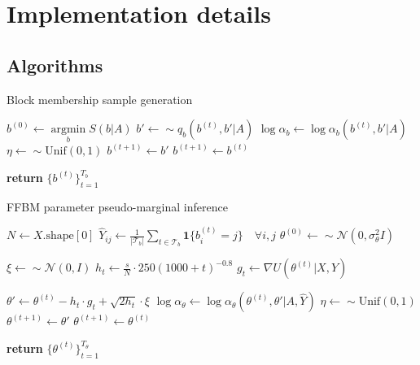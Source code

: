 \section{Implementation details}

\subsection{Algorithms}
\label{appdx:algorithms}

\begin{algorithm} %
	\caption{Block membership sample generation} %
	\label{alg:b-samples} %
	\begin{algorithmic} %
		\State $b^{(0)} \gets \underset{b}{\operatorname{argmin}}S(b|A)$ 
		\State $b' \gets \sim q_b(b^{(t)}, b' | A)$
		\State $\log \alpha_b \gets \log \alpha_b(b^{(t)}, b' | A)$
		\State $\eta \gets \sim \textrm{Unif}(0,1)$
		\State $b^{(t+1)} \gets b'$
		\Else
		\State $b^{(t+1)} \gets b^{(t)}$
		\EndIf
		\EndFor
		
		\State \textbf{return} $\{b^{(t)}\}_{t=1}^{T_b}$
		\EndProcedure
	\end{algorithmic}
\end{algorithm}

\begin{algorithm} %
	\caption{FFBM parameter pseudo-marginal inference} %
	\label{alg:theta-samples} %
	\begin{algorithmic} %
		
		\State $N \gets X.\textrm{shape}[0]$
		\State $\hat{Y}_{ij} \gets \frac{1}{|\mathcal{T}_b|} \sum_{t \in \mathcal{T}_b} \boldsymbol{1} \{ b^{(t)}_i = j\} \quad \forall i,j$
		\State $\theta^{(0)} \gets \sim \mathcal{N}(0, \sigma_\theta^2 I)$
		
		\item[]
		
		\State $\xi \gets \sim \mathcal{N}(0, I)$
		\State $h_t \gets \frac{s}{N} \cdot 250(1000 + t)^{-0.8}$
		\State $g_t \gets \nabla U(\theta^{(t)}| X, \hat{Y})$
		\item[]
		\State $\theta' \gets \theta^{(t)} - h_t \cdot g_t + \sqrt{2h_t} \cdot \xi$
		\State $\log \alpha_\theta \gets \log \alpha_\theta(\theta^{(t)}, \theta' | A, \hat{Y})$
		\State $\eta \gets \sim \textrm{Unif}(0,1)$
		\If{$\log \eta < \log \alpha_\theta$}
		\State $\theta^{(t+1)} \gets \theta'$
		\Else
		\State $\theta^{(t+1)} \gets \theta^{(t)}$
		\EndIf
		\EndFor
		
		\State \textbf{return} $\{\theta^{(t)}\}_{t=1}^{T_\theta}$
		\EndProcedure
	\end{algorithmic}
\end{algorithm}

